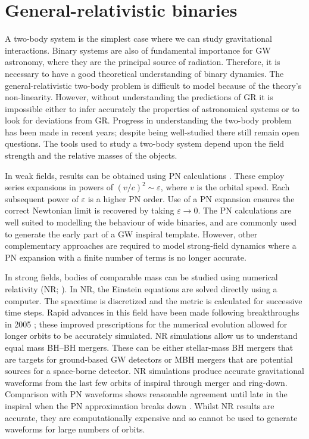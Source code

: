 \section{General-relativistic binaries}\label{sec:two-body}

A two-body system is the simplest case where we can study gravitational interactions. Binary systems are also of fundamental importance for GW astronomy, where they are the principal source of radiation. Therefore, it is necessary to have a good theoretical understanding of binary dynamics. The general-relativistic two-body problem is difficult to model because of the theory's non-linearity. However, without understanding the predictions of GR it is impossible either to infer accurately the properties of astronomical systems or to look for deviations from GR. Progress in understanding the two-body problem has been made in recent years; despite being well-studied there still remain open questions. The tools used to study a two-body system depend upon the field strength and the relative masses of the objects.

In weak fields, results can be obtained using PN calculations \citep{Blanchet2006}. These employ series expansions in powers of  $(v/c)^2 \sim \varepsilon$, where $v$ is the orbital speed. Each subsequent power of $\varepsilon$ is a higher PN order. Use of a PN expansion ensures the correct Newtonian limit is recovered by taking $\varepsilon \rightarrow 0$. The PN calculations are well suited to modelling the behaviour of wide binaries, and are commonly used to generate the early part of a GW inspiral template. However, other complementary approaches are required to model strong-field dynamics where a PN expansion with a finite number of terms is no longer accurate.

In strong fields, bodies of comparable mass can be studied using numerical relativity (NR; \citealt{Centrella2010,Pfeiffer2012,Sperhake2013}). In NR, the Einstein equations are solved directly using a computer. The spacetime is discretized and the metric is calculated for successive time steps. Rapid advances in this field have been made following breakthroughs in 2005 \citep{Pretorius2005,Campanelli2006,Baker2006}; these improved prescriptions for the numerical evolution allowed for longer orbits to be accurately simulated. NR simulations allow us to understand equal mass BH--BH mergers. These can be either stellar-mass BH mergers that are targets for ground-based GW detectors or MBH mergers that are potential sources for a space-borne detector. NR simulations produce accurate gravitational waveforms from the last few orbits of inspiral through merger and ring-down. Comparison with PN waveforms shows reasonable agreement until late in the inspiral when the PN approximation breaks down \citep[e.g.,][]{Baker2007,Buonanno2007}. Whilst NR results are accurate, they are computationally expensive and so cannot be used to generate waveforms for large numbers of orbits.

